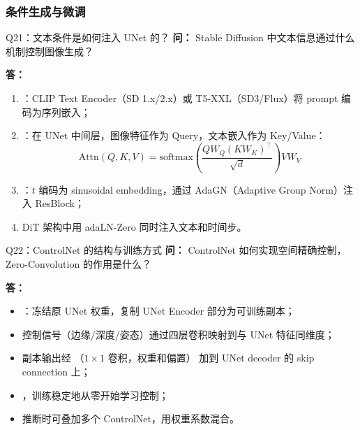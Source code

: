 \subsubsection{条件生成与微调}

\begin{conceptbox}{Q21：文本条件是如何注入 UNet 的？}
\textbf{问：} Stable Diffusion 中文本信息通过什么机制控制图像生成？

\textbf{答：}
\begin{enumerate}
  \item {}：CLIP Text Encoder（SD 1.x/2.x）或 T5-XXL（SD3/Flux）将 prompt 编码为序列嵌入；
  \item {}：在 UNet 中间层，图像特征作为 Query，文本嵌入作为 Key/Value：
    \[
      \text{Attn}(Q,K,V) = \text{softmax}\!\left(\frac{QW_Q(KW_K)^\top}{\sqrt{d}}\right)VW_V
    \]
  \item {}：$t$ 编码为 sinusoidal embedding，通过 AdaGN（Adaptive Group Norm）注入 ResBlock；
  \item DiT 架构中用 adaLN-Zero 同时注入文本和时间步。
\end{enumerate}
\end{conceptbox}

\begin{conceptbox}{Q22：ControlNet 的结构与训练方式}
\textbf{问：} ControlNet 如何实现空间精确控制，Zero-Convolution 的作用是什么？

\textbf{答：}
\begin{itemize}
  \item {}：冻结原 UNet 权重，复制 UNet Encoder 部分为可训练副本；
  \item 控制信号（边缘/深度/姿态）通过四层卷积映射到与 UNet 特征同维度；
  \item 副本输出经 （$1\times1$ 卷积，权重和偏置）
    加到 UNet decoder 的 skip connection 上；
  \item {}，训练稳定地从零开始学习控制；
  \item 推断时可叠加多个 ControlNet，用权重系数混合。
\end{itemize}
\end{conceptbox}

